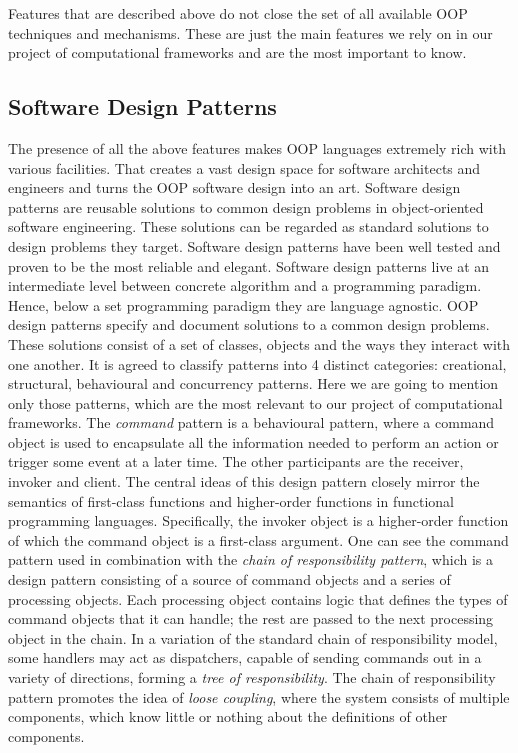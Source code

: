 \quad Features that are described above do not close the set of all available OOP techniques and mechanisms. These are just the main features we rely on in our project of computational frameworks and are the most important to know.
\subsection{Software Design Patterns}
\label{background_design}
\quad The presence of all the above features makes OOP languages extremely rich with various facilities. That creates a vast design space for software architects and engineers and turns the OOP software design into an art. Software design patterns are reusable solutions to common design problems in object-oriented software engineering. These solutions can be regarded as standard solutions to design problems they target. Software design patterns have been well tested and proven to be the most reliable and elegant.\newline\null
\quad Software design patterns live at an intermediate level between concrete algorithm and a programming paradigm. Hence, below a set programming paradigm they are language agnostic. OOP design patterns specify and document solutions to a common design problems. These solutions consist of a set of classes, objects and the ways they interact with one another. It is agreed to classify patterns into 4 distinct categories: creational, structural, behavioural and concurrency patterns. Here we are going to mention only those patterns, which are the most relevant to our project of computational frameworks.\newline\null
\quad The \textit{command} pattern is a behavioural pattern, where a command object is used to encapsulate all the information needed to perform an action or trigger some event at a later time. The other participants are the receiver, invoker and client. The central ideas of this design pattern closely mirror the semantics of first-class functions and higher-order functions in functional programming languages. Specifically, the invoker object is a higher-order function of which the command object is a first-class argument.\newline\null
\quad One can see the command pattern used in combination with the \textit{chain of responsibility pattern}, which is a design pattern consisting of a source of command objects and a series of processing objects. Each processing object contains logic that defines the types of command objects that it can handle; the rest are passed to the next processing object in the chain. In a variation of the standard chain of responsibility model, some handlers may act as dispatchers, capable of sending commands out in a variety of directions, forming a \textit{tree of responsibility}. The chain of responsibility pattern promotes the idea of \textit{loose coupling}, where the system consists of multiple components, which know little or nothing about the definitions of other components.\newline\null
